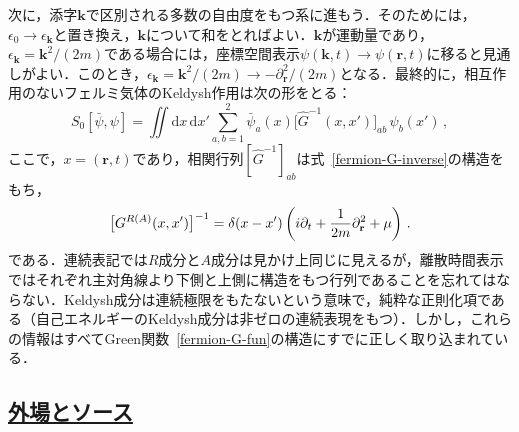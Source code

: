 \documentclass[a4paper,11pt]{ltjsarticle}
\newcommand{\subsectionlink}[1]{\subsection[#1]{\hyperlink{toc}{#1}}}
\def\d{\mathrm{d}}
\begin{document}
次に，添字$\mathbf{k}$で区別される多数の自由度をもつ系に進もう．そのためには，$\epsilon_0\to \epsilon_\mathbf{k}$と置き換え，$\mathbf{k}$について和をとればよい．$\mathbf{k}$が運動量であり，$\epsilon_\mathbf{k}=\mathbf{k}^2/(2m)$である場合には，座標空間表示$\psi(\mathbf{k},t)\to \psi(\mathbf{r},t)$に移ると見通しがよい．このとき，$\epsilon_\mathbf{k}=\mathbf{k}^2/(2m)\to
-\partial^2_\mathbf{r}/(2m)$となる．最終的に，相互作用のないフェルミ気体のKeldysh作用は次の形をとる：
\begin{equation}\label{fermion-S-2}
S_{0}[\bar{\psi},\psi]=\iint \d x\, \d x'\sum\limits_{a,b=1}^2
\bar{\psi}_a(x) \big[\hat G^{-1}(x,x')\big]_{ab} \,\psi_{b}(x')\, ,
\end{equation}
ここで，$x=(\mathbf{r},t)$であり，相関行列$[\hat
G^{-1}]_{ab}$は式~\eqref{fermion-G-inverse}の構造をもち，
\begin{equation}\label{fermion-G-inverse-1}
\big[G^{R(A)}(x,x')\big]^{-1} =\delta(x-x')\left(i\partial_{t} +
{1\over 2m}
\partial_{\mathbf{r}}^2 + \mu \right)\, .
\end{equation}
である．連続表記では$R$成分と$A$成分は見かけ上同じに見えるが，離散時間表示ではそれぞれ主対角線より下側と上側に構造をもつ行列であることを忘れてはならない．Keldysh成分は連続極限をもたないという意味で，純粋な正則化項である（自己エネルギーのKeldysh成分は非ゼロの連続表現をもつ）．しかし，これらの情報はすべてGreen関数~\eqref{fermion-G-fun}の構造にすでに正しく取り込まれている．



\subsectionlink{外場とソース}\label{sec_fermion-4}
\end{document}
